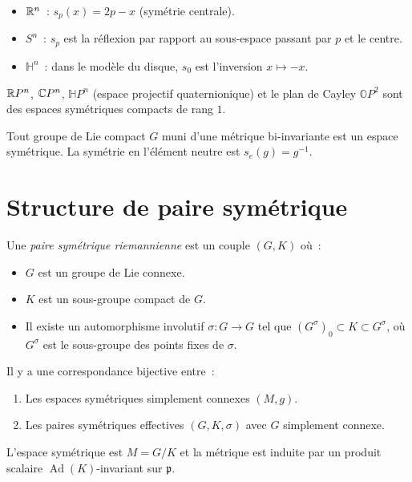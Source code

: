 \begin{exemple}
\begin{itemize}
    \item $\mathbb{R}^n$~: $s_p(x) = 2p - x$ (sym\'etrie centrale).
    \item $S^n$~: $s_p$ est la r\'eflexion par rapport au sous-espace passant par $p$
          et le centre.
    \item $\mathbb{H}^n$~: dans le mod\`ele du disque, $s_0$ est l'inversion $x \mapsto -x$.
\end{itemize}
\end{exemple}

\begin{exemple}
$\mathbb{R} P^n$, $\mathbb{C} P^n$, $\mathbb{H}P^n$ (espace projectif quaternionique) et le plan
de Cayley $\mathbb{O}P^2$ sont des espaces sym\'etriques compacts de rang $1$.
\end{exemple}

\begin{exemple}
Tout groupe de Lie compact $G$ muni d'une m\'etrique bi-invariante est un espace
sym\'etrique. La sym\'etrie en l'\'el\'ement neutre est $s_e(g) = g^{-1}$.
\end{exemple}

\section{Structure de paire sym\'etrique}

\begin{definition}
Une \emph{paire sym\'etrique riemannienne} est un couple $(G, K)$ o\`u~:
\begin{itemize}
    \item $G$ est un groupe de Lie connexe.
    \item $K$ est un sous-groupe compact de $G$.
    \item Il existe un automorphisme involutif $\sigma : G \to G$ tel que
          $(G^\sigma)_0 \subset K \subset G^\sigma$, o\`u $G^\sigma$ est le
          sous-groupe des points fixes de $\sigma$.
\end{itemize}
\end{definition}

\begin{theoreme}
Il y a une correspondance bijective entre~:
\begin{enumerate}
    \item Les espaces sym\'etriques simplement connexes $(M, g)$.
    \item Les paires sym\'etriques effectives $(G, K, \sigma)$ avec $G$ simplement
          connexe.
\end{enumerate}
L'espace sym\'etrique est $M = G/K$ et la m\'etrique est induite par un produit
scalaire $\operatorname{Ad}(K)$-invariant sur $\mathfrak{p}$.
\end{theoreme}

